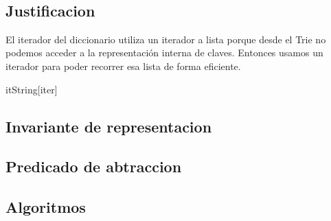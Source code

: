 \begin{Representacion}
~  

\subsection{Justificacion}
El iterador del diccionario utiliza un iterador a lista porque desde el Trie no podemos acceder a la representaci\'on interna de claves. Entonces usamos un iterador para poder recorrer esa lista de forma eficiente.

\begin{Estructura}{itString}[iter]
	\begin{Tupla}[iter]
	\end{Tupla}
\end{Estructura}

\subsection{Invariante de representacion}

\subsection{Predicado de abtraccion}

\end{Representacion}

\subsection{Algoritmos}

